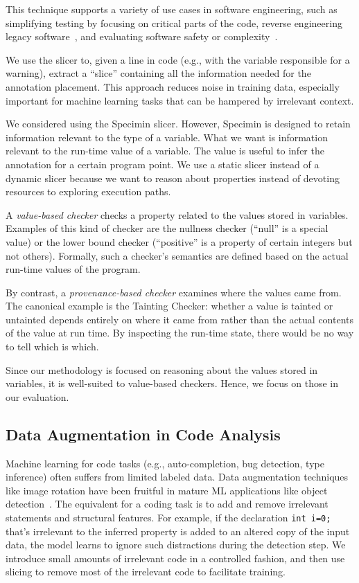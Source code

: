 \documentclass[acmsmall,screen,review,anonymous]{acmart}
\begin{document}
This technique supports a variety of use cases in software engineering, such as simplifying testing by focusing on critical parts of the code, reverse engineering legacy software~\cite{villavicencio2001reverse}, and evaluating software safety or complexity~\cite{gallagher1993software}.

We use the slicer to, given a line in code (e.g., with the variable responsible for a warning), extract a ``slice'' containing all the information needed for the annotation placement. This approach reduces noise in training data, especially important for machine learning tasks that can be hampered by irrelevant context.

We considered using the Specimin slicer. However, Specimin is designed to retain information relevant to the type of a variable. What we want is information relevant to the run-time value of a variable. The value is useful to infer the annotation for a certain program point. We use a static slicer instead of a dynamic slicer because we want to reason about properties instead of devoting resources to exploring execution paths.

A \emph{value-based checker} checks a property related to the values stored in variables. Examples of this kind of checker are the nullness checker (``null'' is a special value) or the lower bound checker (``positive'' is a property of certain integers but not others). Formally, such a checker's semantics are defined based on the actual run-time values of the program.

By contrast, a \emph{provenance-based checker} examines where the values came from. The canonical example is the Tainting Checker: whether a value is tainted or untainted depends entirely on where it came from rather than the actual contents of the value at run time. By inspecting the run-time state, there would be no way to tell which is which.

Since our methodology is focused on reasoning about the values stored in variables, it is well-suited to value-based checkers. Hence, we focus on those in our evaluation.

\subsection{Data Augmentation in Code Analysis}
\label{sec:augmentation}

Machine learning for code tasks (e.g., auto-completion, bug detection, type inference) often suffers from limited labeled data. Data augmentation techniques like image rotation have been fruitful in mature ML applications like object detection~\cite{bengio2017deep}. The equivalent for a coding task is to add and remove irrelevant statements and structural features. For example, if the declaration \texttt{int i=0;} that's irrelevant to the inferred property is added to an altered copy of the input data, the model learns to ignore such distractions during the detection step. We introduce small amounts of irrelevant code in a controlled fashion, and then use slicing to remove most of the irrelevant code to facilitate training.
\end{document}

